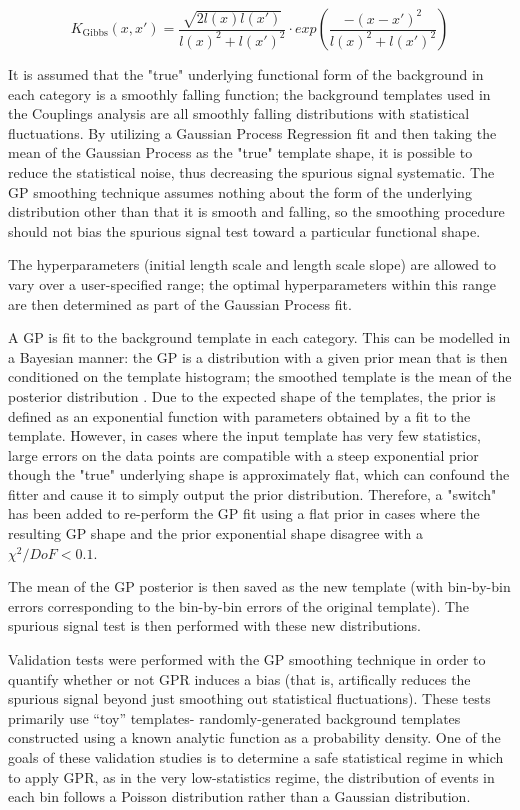 \begin{equation}
K_\text{Gibbs}(x, x') = \frac{\sqrt{2l(x)l(x')}}{l(x)^2 + l(x')^2 } \cdot exp\left( \frac{-(x-x')^2}{l(x)^2 + l(x')^2} \right)
\end{equation}


It is assumed that the "true" underlying functional form of the background in each category is a smoothly falling function; the background templates used in the Couplings analysis are all smoothly falling distributions with statistical fluctuations. By utilizing a Gaussian Process Regression fit and then taking the mean of the Gaussian Process as the "true" template shape, it is possible to reduce the statistical noise, thus decreasing the spurious signal systematic. The GP smoothing technique assumes nothing about the form of the underlying distribution other than that it is smooth and falling, so the smoothing procedure should not bias the spurious signal test toward a particular functional shape.

The hyperparameters (initial length scale and length scale slope) are allowed to vary over a user-specified range; the optimal hyperparameters within this range are then determined as part of the Gaussian Process fit.

A GP is fit to the background template in each category. This can be modelled in a Bayesian manner: the GP is a distribution with a given prior mean that is then conditioned on the template histogram; the smoothed template is the mean of the posterior distribution \cite{3569}. Due to the expected shape of the templates, the prior is defined as an exponential function with parameters obtained by a fit to the template. However, in cases where the input template has very few statistics, large errors on the data points are compatible with a steep exponential prior though the "true" underlying shape is approximately flat, which can confound the fitter and cause it to simply output the prior distribution. Therefore, a "switch" has been added to re-perform the GP fit using a flat prior in cases where the resulting GP shape and the prior exponential shape disagree with a $\chi^2/DoF < 0.1$.

The mean of the GP posterior is then saved as the new template (with bin-by-bin errors corresponding to the bin-by-bin errors of the original template). The spurious signal test is then performed with these new distributions.

Validation tests were performed with the GP smoothing technique in order to quantify whether or not GPR induces a bias (that is, artifically reduces the spurious signal beyond just smoothing out statistical fluctuations). These tests primarily use “toy” templates- randomly-generated background templates constructed using a known analytic function as a probability density. One of the goals of these validation studies is to determine a safe statistical regime in which to apply GPR, as in the very low-statistics regime, the distribution of events in each bin follows a Poisson distribution rather than a Gaussian distribution.

